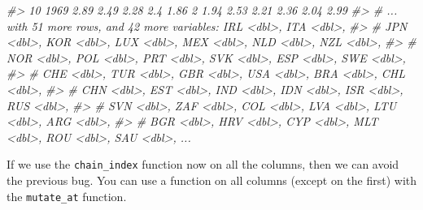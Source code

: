 \documentclass[
]{article}
\newenvironment{Shaded}{\begin{snugshade}}{\end{snugshade}}
\newcommand{\CommentTok}[1]{\textcolor[rgb]{0.56,0.35,0.01}{\textit{#1}}}
\begin{document}
\begin{Shaded}
\begin{Highlighting}[]
\CommentTok{\#\textgreater{} 10  1969  2.89  2.49  2.28  2.4   1.86  2     1.94  2.53  2.21  2.36  2.04  2.99}
\CommentTok{\#\textgreater{} \# ... with 51 more rows, and 42 more variables: IRL \textless{}dbl\textgreater{}, ITA \textless{}dbl\textgreater{},}
\CommentTok{\#\textgreater{} \#   JPN \textless{}dbl\textgreater{}, KOR \textless{}dbl\textgreater{}, LUX \textless{}dbl\textgreater{}, MEX \textless{}dbl\textgreater{}, NLD \textless{}dbl\textgreater{}, NZL \textless{}dbl\textgreater{},}
\CommentTok{\#\textgreater{} \#   NOR \textless{}dbl\textgreater{}, POL \textless{}dbl\textgreater{}, PRT \textless{}dbl\textgreater{}, SVK \textless{}dbl\textgreater{}, ESP \textless{}dbl\textgreater{}, SWE \textless{}dbl\textgreater{},}
\CommentTok{\#\textgreater{} \#   CHE \textless{}dbl\textgreater{}, TUR \textless{}dbl\textgreater{}, GBR \textless{}dbl\textgreater{}, USA \textless{}dbl\textgreater{}, BRA \textless{}dbl\textgreater{}, CHL \textless{}dbl\textgreater{},}
\CommentTok{\#\textgreater{} \#   CHN \textless{}dbl\textgreater{}, EST \textless{}dbl\textgreater{}, IND \textless{}dbl\textgreater{}, IDN \textless{}dbl\textgreater{}, ISR \textless{}dbl\textgreater{}, RUS \textless{}dbl\textgreater{},}
\CommentTok{\#\textgreater{} \#   SVN \textless{}dbl\textgreater{}, ZAF \textless{}dbl\textgreater{}, COL \textless{}dbl\textgreater{}, LVA \textless{}dbl\textgreater{}, LTU \textless{}dbl\textgreater{}, ARG \textless{}dbl\textgreater{},}
\CommentTok{\#\textgreater{} \#   BGR \textless{}dbl\textgreater{}, HRV \textless{}dbl\textgreater{}, CYP \textless{}dbl\textgreater{}, MLT \textless{}dbl\textgreater{}, ROU \textless{}dbl\textgreater{}, SAU \textless{}dbl\textgreater{}, ...}
\end{Highlighting}
\end{Shaded}

If we use the \texttt{chain\_index} function now on all the columns, then we can avoid the previous bug. You can use a function on all columns (except on the first) with the \texttt{mutate\_at} function.
\end{document}
